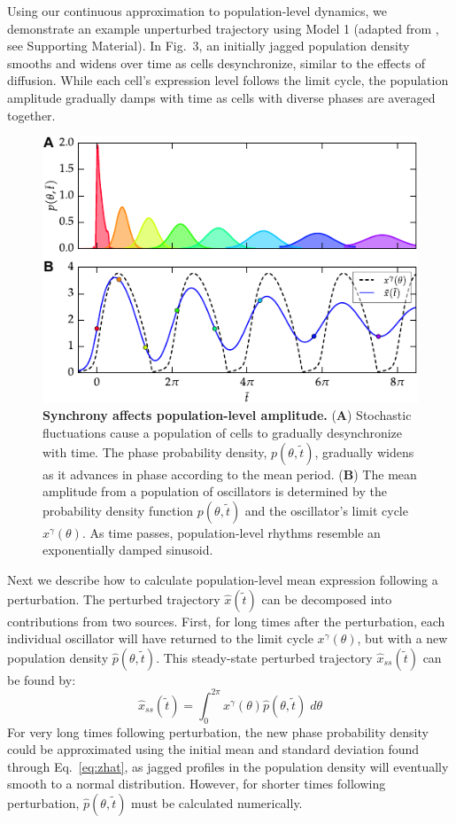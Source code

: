 \documentclass[11pt, letterpaper]{article}
\begin{document}
Using our continuous approximation to population-level dynamics, we demonstrate an example unperturbed trajectory using Model 1 (adapted from \cite{Novak2008}, see Supporting Material).
In Fig.~3, an initially jagged population density smooths and widens over time as cells desynchronize, similar to the effects of diffusion.
While each cell's expression level follows the limit cycle, the population amplitude gradually damps with time as cells with diverse phases are averaged together.


\begin{figure}[tbp]
  \begin{center}
    \includegraphics[width=.75\textwidth]{figures/figure_3.pdf}
    \caption{
{\bfseries Synchrony affects population-level amplitude.}
({\bfseries A}) Stochastic fluctuations cause a population of cells to gradually desynchronize with time.
The phase probability density, $p(\theta, \tilde{t})$, gradually widens as it advances in phase according to the mean period.
({\bfseries B}) The mean amplitude from a population of oscillators is determined by the probability density function $p(\theta, \tilde{t})$ and the oscillator's limit cycle $x^\gamma(\theta)$.
As time passes, population-level rhythms resemble an exponentially damped sinusoid.}
  \end{center}
\end{figure}

Next we describe how to calculate population-level mean expression following a perturbation.
The perturbed trajectory $\hat{x}(\tilde{t})$ can be decomposed into contributions from two sources.
First, for long times after the perturbation, each individual oscillator will have returned to the limit cycle $x^\gamma(\theta)$, but with a new population density $\hat{p}(\theta, \tilde{t})$.
This steady-state perturbed trajectory $\hat{x}_{ss}(\tilde{t})$ can be found by:
\begin{equation}
  \hat{x}_{ss}(\tilde{t}) = \int_0^{2\pi} x^\gamma(\theta) \hat{p}(\theta, \tilde{t}) \; d\theta
  \label{eq:xhatss}
\end{equation}
For very long times following perturbation, the new phase probability density could be approximated using the initial mean and standard deviation found through Eq.~\ref{eq:zhat}, as jagged profiles in the population density will eventually smooth to a normal distribution.
However, for shorter times following perturbation, $\hat{p}(\theta, \tilde{t})$ must be calculated numerically.
\end{document}
